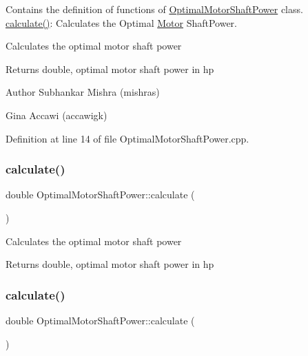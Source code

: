 Contains the definition of functions of \hyperlink{class_optimal_motor_shaft_power}{Optimal\+Motor\+Shaft\+Power} class. \hyperlink{class_optimal_motor_shaft_power_a34d47733928ae518fa6f3d08b7d8a12e}{calculate()}\+: Calculates the Optimal \hyperlink{class_motor}{Motor} Shaft\+Power. 

Calculates the optimal motor shaft power

\begin{DoxyReturn}{Returns}
double, optimal motor shaft power in hp
\end{DoxyReturn}
\begin{DoxyAuthor}{Author}
Subhankar Mishra (mishras) 

Gina Accawi (accawigk) 
\end{DoxyAuthor}


Definition at line 14 of file Optimal\+Motor\+Shaft\+Power.\+cpp.

\mbox{\label{class_optimal_motor_shaft_power_a34d47733928ae518fa6f3d08b7d8a12e}} 
\subsubsection{\texorpdfstring{calculate()}{calculate()}\hspace{0.1cm}{\footnotesize\ttfamily [2/3]}}
{\footnotesize\ttfamily double Optimal\+Motor\+Shaft\+Power\+::calculate (\begin{DoxyParamCaption}{ }\end{DoxyParamCaption})}

Calculates the optimal motor shaft power

\begin{DoxyReturn}{Returns}
double, optimal motor shaft power in hp 
\end{DoxyReturn}
\mbox{\label{class_optimal_motor_shaft_power_a34d47733928ae518fa6f3d08b7d8a12e}} 
\subsubsection{\texorpdfstring{calculate()}{calculate()}\hspace{0.1cm}{\footnotesize\ttfamily [3/3]}}
{\footnotesize\ttfamily double Optimal\+Motor\+Shaft\+Power\+::calculate (\begin{DoxyParamCaption}{ }\end{DoxyParamCaption})}

